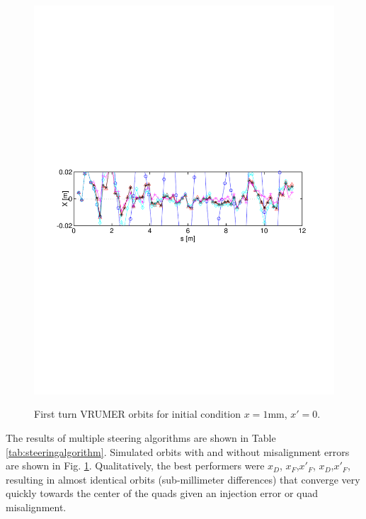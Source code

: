 \begin{figure}[!htb]
{	\includegraphics[width=\textwidth,trim={.5in 4.3in .7in 4.5in},clip]{6.figures/vrumer_steering_algorithm_compare_x1_xp0_sig5.pdf}}
\caption{First turn VRUMER orbits for initial condition $x=1$mm, $x'=0$. 
}
\label{fig:steeringalgorithm}
\end{figure}




The results of multiple steering algorithms are shown in Table \ref{tab:steeringalgorithm}. Simulated orbits with and without misalignment errors are shown in Fig. \ref{fig:steeringalgorithm}. Qualitatively, the best performers were $x_D$, $x_F$,$x'_F$, $x_D$,$x'_F$, resulting in almost identical orbits (sub-millimeter differences) that converge very quickly towards the center of the quads given an injection error or quad misalignment.

